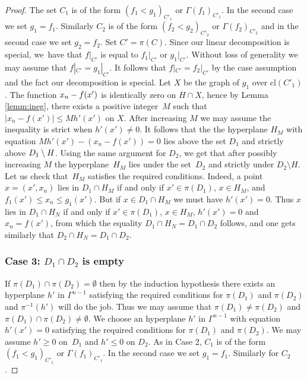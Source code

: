 \documentclass[JEP,XML,SOM,Unicode,ThmDefs,NoEqCountersInSection,published]{cedram}
\newcommand{\cl}{\mathrm{cl}}
\theoremstyle{plain}
\theoremstyle{definition}
\begin{document}
\begin{proof}
The set $C_1$ is of the form $(f_1 < g_1)_{C'_1}$ or $\Gamma (f_1)_{C'_1}$. In the second case we set $g_1 = f_1$.
Similarly $C_2$ is of the form $(f_2 <g_2)_{C'_2}$ or $\Gamma (f_2)_{C'_2}$ and in the second case we set $g_2 = f_2$.
Set $C' = \pi (C)$.
Since our linear decomposition is special,
we~have that $f|_{C'}$ is equal to $f_1|_{C'}$ or $g_1|_{C'}$. Without loss of generality we may assume that $f|_{C'} = g_1|_{C'}$. It follows that $f|_{C'}=f_2|_{C'}$ by the case assumption and the fact our decomposition is special.
Let $X$ be the graph of $g_1$ over $\cl (C'_1)$. The function $x_n -\nobreak f (x')$ is identically zero on
$H \cap X$, hence by Lemma \ref{lemm:ineg}, there exists a positive integer~$M$ such that
$\vert x_n - f (x') \vert \leq M h' (x')$ on $X$. After increasing $M$ we may assume the inequality is strict when $h' (x') \neq 0$.
It follows that the
the hyperplane $H_M$ with equation \hbox{$Mh'(x') - (x_n - f (x')) = 0$} lies above the set $D_1$
and strictly above $D_1 \setminus\nobreak H$. Using the same argument for $D_2$, we get that after possibly increasing $M$
the hyperplane~$H_M$ lies under the set~$D_2$ and strictly under $D_2 \setminus H$.
Let us check that~$H_M$ satisfies the required conditions.
Indeed, a point $x = (x', x_n)$ lies in $D_1 \cap H_M$ if and only if
$x' \in \pi (D_1)$, $x \in H_M$, and $f_1 (x') \leq x_n \leq g_1 (x')$.
But if $x \in D_1 \cap H_M$ we must have $h'(x') = 0$.
Thus
$x$ lies in $D_1 \cap H_N$ if and only if
$x' \in \pi (D_1)$, $x \in H_M$, $h'(x')= 0$ and $x_n = f(x')$, from which the equality
$D_1 \cap H_N = D_1 \cap D_2$ follows, and one gets similarly that
$D_2 \cap H_N = D_1 \cap D_2$.

\subsubsection*{Case 3: $D_1 \cap D_2$ is empty}

If $\pi (D_1) \cap \pi (D_2) = \emptyset$ then by the induction hypothesis there exists an hyperplane
$h'$ in $\Gamma^{n -1}$ satisfying the required conditions for $\pi (D_1)$ and $\pi (D_2)$ and $\pi^{-1} (h')$ will do the job.
Thus we may assume that $\pi (D_1) \neq \pi (D_2)$ and $\pi (D_1) \cap \pi (D_2) \neq \emptyset$.
We choose an
hyperplane
$h'$ in $\Gamma^{n -1}$ with equation $h'(x')=0$ satisfying the required conditions for $\pi (D_1)$ and $\pi (D_2)$.
We may assume $h' \geq 0$ on~$D_1$ and $h' \leq 0$ on $D_2$.
As in Case 2, $C_1$ is of the form $(f_1 <g_1)_{C'_1}$ or $\Gamma (f_1)_{C'_1}$. In the second case we set $g_1 = f_1$.
Similarly for $C_2$.


\end{proof}
\end{document}
